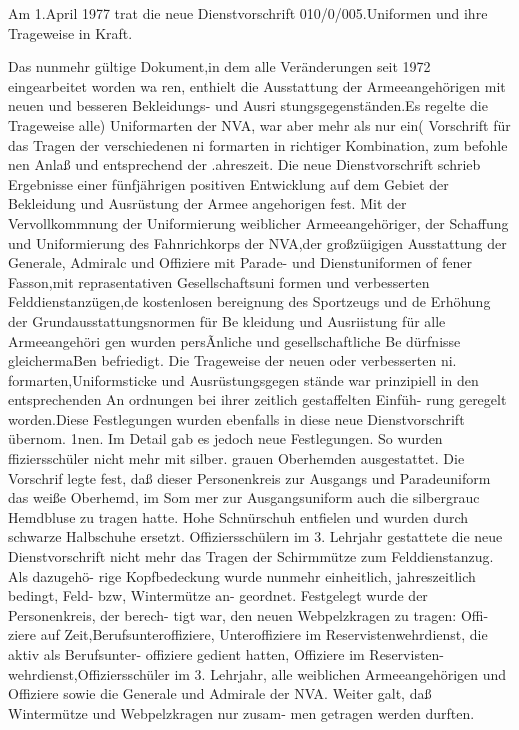 

Am 1.April 1977 trat die neue Dienstvorschrift
010/0/005.Uniformen und ihre Trageweise in
Kraft.

Das nunmehr gültige Dokument,in dem alle
Veränderungen seit 1972 eingearbeitet worden wa
ren, enthielt die Ausstattung der Armeeangehörigen
mit neuen und besseren Bekleidungs- und Ausri
stungsgegenständen.Es regelte die Trageweise alle)
Uniformarten der NVA, war aber mehr als nur ein(
Vorschrift für das Tragen der verschiedenen ni
formarten in richtiger Kombination, zum befohle
nen Anlaß und entsprechend der .ahreszeit.
Die neue Dienstvorschrift schrieb Ergebnisse
einer fünfjährigen positiven Entwicklung auf dem
Gebiet der Bekleidung und Ausrüstung der Armee
angehorigen fest.
Mit der Vervollkommnung der Uniformierung
weiblicher Armeeangehöriger, der Schaffung und
Uniformierung des Fahnrichkorps der NVA,der
großzüigigen Ausstattung der Generale, Admiralc
und Offiziere mit Parade- und Dienstuniformen of
fener Fasson,mit reprasentativen Gesellschaftsuni
formen und verbesserten Felddienstanzügen,de
kostenlosen bereignung des Sportzeugs und de
Erhöhung der Grundausstattungsnormen für Be
kleidung und Ausriistung für alle Armeeangehöri
gen wurden persÃnliche und gesellschaftliche Be
dürfnisse gleichermaBen befriedigt.
Die Trageweise der neuen oder verbesserten ni.
formarten,Uniformsticke und Ausrüstungsgegen
stände war prinzipiell in den entsprechenden An
ordnungen bei ihrer zeitlich gestaffelten Einfüh-
rung geregelt worden.Diese Festlegungen wurden
ebenfalls in diese neue Dienstvorschrift übernom.
1nen.
Im Detail gab es jedoch neue Festlegungen. So
wurden ffiziersschüler nicht mehr mit silber.
grauen Oberhemden ausgestattet. Die Vorschrif
legte fest, daß dieser Personenkreis zur Ausgangs
und Paradeuniform das weiße Oberhemd, im Som
mer zur Ausgangsuniform auch die silbergrauc
Hemdbluse zu tragen hatte. Hohe Schnürschuh
entfielen und wurden durch schwarze Halbschuhe
ersetzt.
Offiziersschülern im 3. Lehrjahr gestattete die
neue Dienstvorschrift nicht mehr das Tragen der Schirmmütze zum Felddienstanzug. Als dazugehö-
rige Kopfbedeckung wurde nunmehr einheitlich,
jahreszeitlich bedingt, Feld- bzw, Wintermütze an-
geordnet.
Festgelegt wurde der Personenkreis, der berech-
tigt war, den neuen Webpelzkragen zu tragen: Offi-
ziere auf Zeit,Berufsunteroffiziere, Unteroffiziere
im Reservistenwehrdienst, die aktiv als Berufsunter-
offiziere gedient hatten, Offiziere im Reservisten-
wehrdienst,Offiziersschüler im 3. Lehrjahr, alle
weiblichen Armeeangehörigen und Offiziere sowie
die Generale und Admirale der NVA. Weiter galt,
daß Wintermütze und Webpelzkragen nur zusam-
men getragen werden durften.

